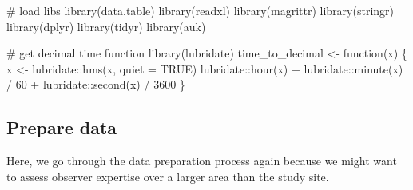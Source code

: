 \documentclass[]{article}
\newenvironment{Shaded}{}{}
\newcommand{\CommentTok}[1]{\textcolor[rgb]{0.00,0.50,0.00}{#1}}
\newcommand{\ControlFlowTok}[1]{\textcolor[rgb]{0.00,0.00,1.00}{#1}}
\newcommand{\DataTypeTok}[1]{#1}
\newcommand{\DecValTok}[1]{#1}
\newcommand{\KeywordTok}[1]{\textcolor[rgb]{0.00,0.00,1.00}{#1}}
\newcommand{\NormalTok}[1]{#1}
\newcommand{\OperatorTok}[1]{#1}
\newcommand{\OtherTok}[1]{\textcolor[rgb]{1.00,0.25,0.00}{#1}}
\newcommand{\StringTok}[1]{\textcolor[rgb]{0.00,0.50,0.50}{#1}}
\begin{document}
\begin{Shaded}
\begin{Highlighting}[]

\CommentTok{# load libs}
\KeywordTok{library}\NormalTok{(data.table)}
\KeywordTok{library}\NormalTok{(readxl)}
\KeywordTok{library}\NormalTok{(magrittr)}
\KeywordTok{library}\NormalTok{(stringr)}
\KeywordTok{library}\NormalTok{(dplyr)}
\KeywordTok{library}\NormalTok{(tidyr)}
\KeywordTok{library}\NormalTok{(auk)}

\CommentTok{# get decimal time function}
\KeywordTok{library}\NormalTok{(lubridate)}
\NormalTok{time_to_decimal <-}\StringTok{ }\ControlFlowTok{function}\NormalTok{(x) \{}
\NormalTok{  x <-}\StringTok{ }\NormalTok{lubridate}\OperatorTok{::}\KeywordTok{hms}\NormalTok{(x, }\DataTypeTok{quiet =} \OtherTok{TRUE}\NormalTok{)}
\NormalTok{  lubridate}\OperatorTok{::}\KeywordTok{hour}\NormalTok{(x) }\OperatorTok{+}\StringTok{ }\NormalTok{lubridate}\OperatorTok{::}\KeywordTok{minute}\NormalTok{(x) }\OperatorTok{/}\StringTok{ }\DecValTok{60} \OperatorTok{+}\StringTok{ }\NormalTok{lubridate}\OperatorTok{::}\KeywordTok{second}\NormalTok{(x) }\OperatorTok{/}\StringTok{ }\DecValTok{3600}
\NormalTok{\}}
\end{Highlighting}
\end{Shaded}

\hypertarget{prepare-data}{%
\subsection{Prepare data}\label{prepare-data}}

Here, we go through the data preparation process again because we might want to assess observer expertise over a larger area than the study site.
\end{document}
